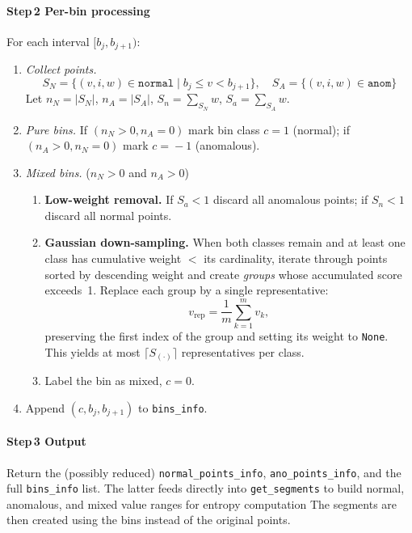 \documentclass[11pt]{article}
\begin{document}
\paragraph{Step\,2 Per-bin processing}  
For each interval $[b_j,b_{j+1})$:
\begin{enumerate}[label=\alph*)]
  \item \emph{Collect points.}
        \[
          S_N=\{(v,i,w)\!\in\!\texttt{normal} \mid b_j\le v<b_{j+1}\},\quad
          S_A=\{(v,i,w)\!\in\!\texttt{anom}\}
        \]
        Let $n_N=\lvert S_N\rvert$, $n_A=\lvert S_A\rvert$,
        $S_n=\sum_{S_N} w$, $S_a=\sum_{S_A} w$.
  \item \emph{Pure bins.}  
        If $(n_N>0, n_A=0)$ mark bin class $c\!=\!1$ (normal);  
        if $(n_A>0, n_N=0)$ mark $c\!=\!-1$ (anomalous).
  \item \emph{Mixed bins.}  ($n_N>0$ and $n_A>0$)
        \begin{enumerate}[label=\roman*.]
          \item \textbf{Low-weight removal.}  
                If $S_a<1$ discard all anomalous points;
                if $S_n<1$ discard all normal points.
          \item \textbf{Gaussian down-sampling.}  
                When both classes remain and at least one class
                has cumulative weight \(<\) its cardinality,
                iterate through points sorted by descending weight
                and create \emph{groups} whose accumulated score
                exceeds~1.  Replace each group by a single
                representative:
                \[
                  v_{\text{rep}}=\frac{1}{m}\sum_{k=1}^{m}v_k,
                \]
                preserving the first index of the group and setting
                its weight to \texttt{None}.  This yields at most
                \(\lceil S_{(\cdot)}\rceil\) representatives per class.
          \item Label the bin as mixed, $c\!=\!0$.
        \end{enumerate}
  \item Append $(c,b_j,b_{j+1})$ to \texttt{bins\_info}.
\end{enumerate}

\paragraph{Step\,3 Output}
Return the (possibly reduced) \texttt{normal\_points\_info},
\texttt{ano\_points\_info}, and the full \texttt{bins\_info} list.  
The latter feeds directly into \texttt{get\_segments} to build normal,
anomalous, and mixed value ranges for entropy computation
The segments are then created using the bins instead of the original points.
\end{document}
